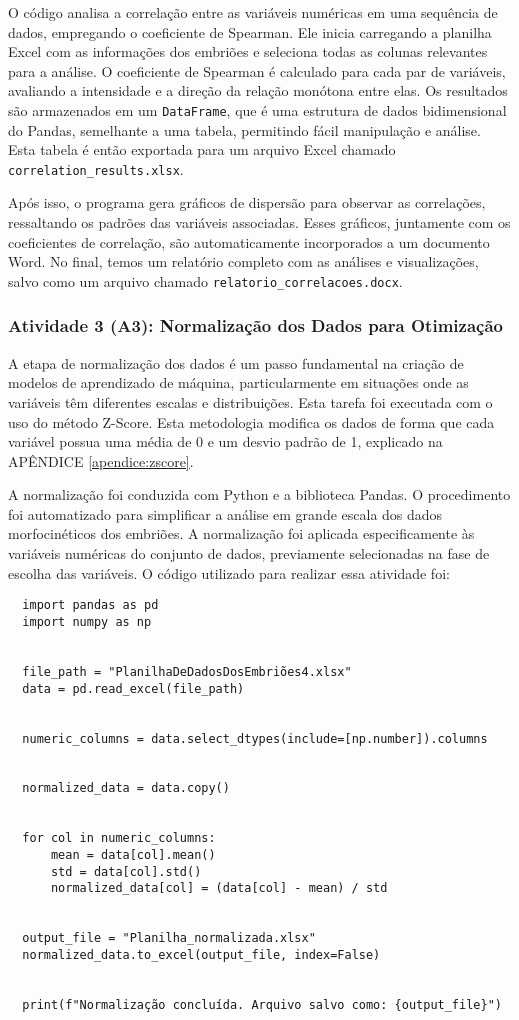 O código analisa a correlação entre as variáveis numéricas em uma sequência de dados, empregando o coeficiente de Spearman. Ele inicia carregando a planilha Excel com as informações dos embriões e seleciona todas as colunas relevantes para a análise. O coeficiente de Spearman é calculado para cada par de variáveis, avaliando a intensidade e a direção da relação monótona entre elas. Os resultados são armazenados em um \texttt{DataFrame}, que é uma estrutura de dados bidimensional do Pandas, semelhante a uma tabela, permitindo fácil manipulação e análise. Esta tabela é então exportada para um arquivo Excel chamado \texttt{correlation\_results.xlsx}.

Após isso, o programa gera gráficos de dispersão para observar as correlações, ressaltando os padrões das variáveis associadas. Esses gráficos, juntamente com os coeficientes de correlação, são automaticamente incorporados a um documento Word. No final, temos um relatório completo com as análises e visualizações, salvo como um arquivo chamado \texttt{relatorio\_correlacoes.docx}.

\subsubsection{Atividade 3 (A3): Normalização dos Dados para Otimização}
A etapa de normalização dos dados é um passo fundamental na criação de modelos de aprendizado de máquina, particularmente em situações onde as variáveis têm diferentes escalas e distribuições. Esta tarefa foi executada com o uso do método Z-Score. Esta metodologia modifica os dados de forma que cada variável possua uma média de 0 e um desvio padrão de 1, explicado na APÊNDICE \ref{apendice:zscore}. 

A normalização foi conduzida com Python e a biblioteca Pandas. O procedimento foi automatizado para simplificar a análise em grande escala dos dados morfocinéticos dos embriões. A normalização foi aplicada especificamente às variáveis numéricas do conjunto de dados, previamente selecionadas na fase de escolha das variáveis. O código utilizado para realizar essa atividade foi:

\begin{lstlisting}
  import pandas as pd
  import numpy as np
  
  
  file_path = "PlanilhaDeDadosDosEmbriões4.xlsx"  
  data = pd.read_excel(file_path)
  
  
  numeric_columns = data.select_dtypes(include=[np.number]).columns
  
  
  normalized_data = data.copy()
  
  
  for col in numeric_columns:
      mean = data[col].mean()
      std = data[col].std()
      normalized_data[col] = (data[col] - mean) / std
  
  
  output_file = "Planilha_normalizada.xlsx"
  normalized_data.to_excel(output_file, index=False)
  
  
  print(f"Normalização concluída. Arquivo salvo como: {output_file}")
\end{lstlisting}  

